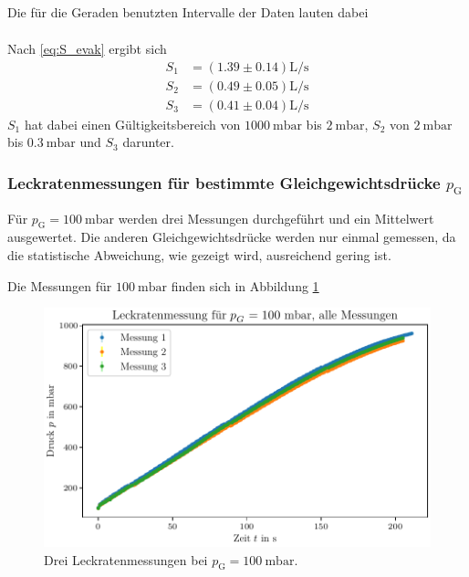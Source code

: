 Die für die Geraden benutzten Intervalle der Daten lauten dabei
\begin{align}
\end{align}

Nach \eqref{eq:S_evak} ergibt sich
\begin{align}
    S_1 &= (\num{1.39} \pm \num{0.14}) \si{\liter\per\second} \\
    S_2 &= (\num{0.49} \pm \num{0.05}) \si{\liter\per\second} \\
    S_3 &= (\num{0.41} \pm \num{0.04}) \si{\liter\per\second} 
\end{align}
$S_1$ hat dabei einen Gültigkeitsbereich von $\SI{1000}{\milli\bar}$ bis $\SI{2}{\milli\bar}$, $S_2$ von $\SI{2}{\milli\bar}$ bis $\SI{0.3}{\milli\bar}$ und $S_3$ darunter.

\subsubsection{Leckratenmessungen für bestimmte Gleichgewichtsdrücke $p_\text{G}$}

Für $p_\text{G} = \SI{100}{\milli\bar}$ werden drei Messungen durchgeführt und ein Mittelwert ausgewertet. Die anderen Gleichgewichtsdrücke werden nur einmal gemessen, da die statistische Abweichung, wie gezeigt wird, ausreichend gering ist.

Die Messungen für $\SI{100}{\milli\bar}$ finden sich in Abbildung \ref{fig:DP_leck_100mbar_alle}

\begin{figure}[H]
    \centering
    \includegraphics[width=\textwidth]{plots/DP_Leck_100mbar_alle.pdf}
    \caption{Drei Leckratenmessungen bei $p_\text{G} = \qty{100}{\milli\bar}$.}
    \label{fig:DP_leck_100mbar_alle}
\end{figure}

